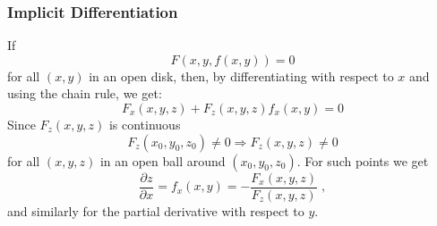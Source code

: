\begin{frame}
    \frametitle{Implicit Differentiation}

If
%
$$F(x,y,f(x,y)) = 0$$
%
for all $(x,y)$ in an open disk, then, by differentiating with respect to $x$ and using the chain rule, we get:
%
$$F_x(x,y,z) + F_z(x,y,z) f_x(x,y) = 0$$
%
Since $F_z(x,y,z)$ is continuous
%
$$F_z(x_0,y_0,z_0) \neq 0 \Longrightarrow F_z(x,y,z) \neq 0$$
%
for all $(x,y,z)$ in an open ball around $(x_0,y_0,z_0)$. For such points we get
%
$$\frac{\partial z}{\partial x} = f_x(x,y) = -\frac{F_x(x,y,z)}{F_z(x,y,z)} \; ,$$
%
and similarly for the partial derivative with respect to $y$.

\end{frame}